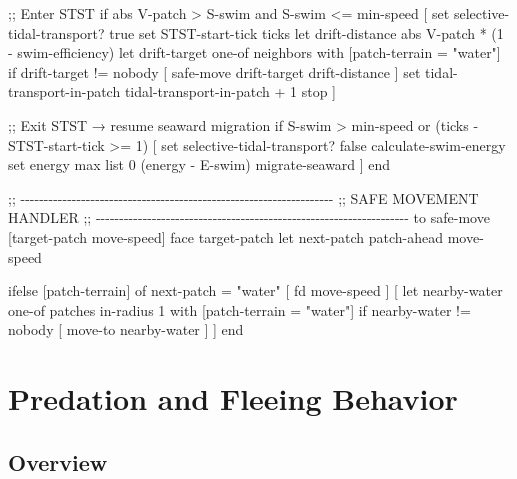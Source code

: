 \documentclass[
]{book}
\newenvironment{Shaded}{\begin{snugshade}}{\end{snugshade}}
\newcommand{\NormalTok}[1]{#1}
\begin{document}
\begin{Shaded}
\begin{Highlighting}[]
\NormalTok{  ;; Enter STST}
\NormalTok{  if abs V{-}patch \textgreater{} S{-}swim and S{-}swim \textless{}= min{-}speed [}
\NormalTok{    set selective{-}tidal{-}transport? true}
\NormalTok{    set STST{-}start{-}tick ticks}
\NormalTok{    let drift{-}distance abs V{-}patch * (1 {-} swim{-}efficiency)}
\NormalTok{    let drift{-}target one{-}of neighbors with [patch{-}terrain = "water"]}
\NormalTok{    if drift{-}target != nobody [ safe{-}move drift{-}target drift{-}distance ]}
\NormalTok{    set tidal{-}transport{-}in{-}patch tidal{-}transport{-}in{-}patch + 1}
\NormalTok{    stop}
\NormalTok{  ]}

\NormalTok{  ;; Exit STST → resume seaward migration}
\NormalTok{  if S{-}swim \textgreater{} min{-}speed or (ticks {-} STST{-}start{-}tick \textgreater{}= 1) [}
\NormalTok{    set selective{-}tidal{-}transport? false}
\NormalTok{    calculate{-}swim{-}energy}
\NormalTok{    set energy max list 0 (energy {-} E{-}swim)}
\NormalTok{    migrate{-}seaward}
\NormalTok{  ]}
\NormalTok{end}

\NormalTok{;; {-}{-}{-}{-}{-}{-}{-}{-}{-}{-}{-}{-}{-}{-}{-}{-}{-}{-}{-}{-}{-}{-}{-}{-}{-}{-}{-}{-}{-}{-}{-}{-}{-}{-}{-}{-}{-}{-}{-}{-}{-}{-}{-}{-}{-}{-}{-}{-}{-}{-}{-}{-}{-}{-}{-}{-}{-}{-}{-}{-}{-}{-}{-}{-}{-}{-}{-}}
\NormalTok{;;  SAFE MOVEMENT HANDLER}
\NormalTok{;; {-}{-}{-}{-}{-}{-}{-}{-}{-}{-}{-}{-}{-}{-}{-}{-}{-}{-}{-}{-}{-}{-}{-}{-}{-}{-}{-}{-}{-}{-}{-}{-}{-}{-}{-}{-}{-}{-}{-}{-}{-}{-}{-}{-}{-}{-}{-}{-}{-}{-}{-}{-}{-}{-}{-}{-}{-}{-}{-}{-}{-}{-}{-}{-}{-}{-}{-}}
\NormalTok{to safe{-}move [target{-}patch move{-}speed]}
\NormalTok{  face target{-}patch}
\NormalTok{  let next{-}patch patch{-}ahead move{-}speed}

\NormalTok{  ifelse [patch{-}terrain] of next{-}patch = "water" [}
\NormalTok{    fd move{-}speed}
\NormalTok{  ] [}
\NormalTok{    let nearby{-}water one{-}of patches in{-}radius 1 with [patch{-}terrain = "water"]}
\NormalTok{    if nearby{-}water != nobody [ move{-}to nearby{-}water ]}
\NormalTok{  ]}
\NormalTok{end}
\end{Highlighting}
\end{Shaded}

\chapter{Predation and Fleeing Behavior}\label{predation-and-fleeing-behavior}

\section{Overview}\label{overview-11}
\end{document}
